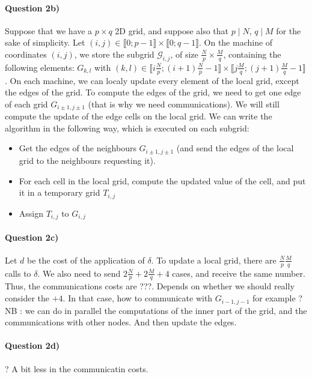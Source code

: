 \documentclass[a4paper,12pt]{article}
\begin{document}
\paragraph{Question 2b)} Suppose that we have a $p \times q$ 2D grid, and suppose also that $p \mid N$, $q \mid M$ for the sake of simplicity. Let $(i, j) \in \llbracket 0; p-1 \rrbracket \times \llbracket 0; q - 1 \rrbracket$. On the machine of coordinates $(i, j)$, we store the subgrid $\mathcal{G}_{i,j}$, of size $\frac{N}{p} \times \frac{M}{q}$, containing the following elements: $G_{k, l}$ with $(k, l) \in \llbracket i\frac{N}{p}; (i+1)\frac{N}{p}-1 \rrbracket \times \llbracket j\frac{M}{q}; (j+1)\frac{M}{q}-1 \rrbracket$. On each machine, we can localy update every element of the local grid, except the edges of the grid. To compute the edges of the grid, we need to get one edge of each grid $G_{i\pm1, j\pm1}$ (that is why we need communications). We will still compute the update of the edge cells on the local grid. We can write the algorithm in the following way, which is executed on each subgrid:
\begin{itemize}
\item Get the edges of the neighbours $G_{i\pm1, j\pm1}$ (and send the edges of the local grid to the neighbours requesting it).
\item For each cell in the local grid, compute the updated value of the cell, and put it in a temporary grid $T_{i, j}$
\item Assign $T_{i,j}$ to $G_{i,j}$
\end{itemize}

\paragraph{Question 2c)}
Let $d$ be the cost of the application of $\delta$. To update a local grid, there are $\frac{N}{p}\frac{M}{q}$ calls to $\delta$. We also need to send $2\frac{N}{p} + 2\frac{M}{q} + 4$ cases, and receive the same number. Thus, the communications costs are ???. Depends on whether we should really consider the $+4$. In that case, how to communicate with $G_{i-1, j-1}$ for example ?\\
NB : we can do in parallel the computations of the inner part of the grid, and the communications with other nodes. And then update the edges.

\paragraph{Question 2d)} ? A bit less in the communicatin costs.
\end{document}
